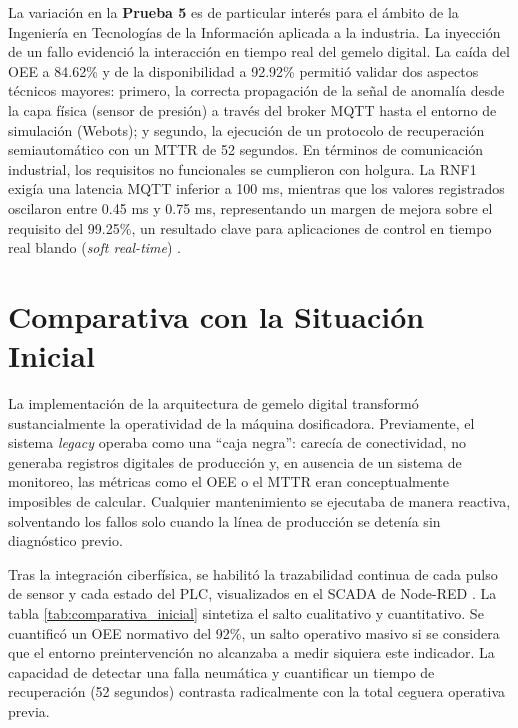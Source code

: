 La variación en la \textbf{Prueba 5} es de particular interés para el ámbito de la Ingeniería en Tecnologías de la Información aplicada a la industria. La inyección de un fallo evidenció la interacción en tiempo real del gemelo digital. La caída del OEE a 84.62\% y de la disponibilidad a 92.92\% permitió validar dos aspectos técnicos mayores: primero, la correcta propagación de la señal de anomalía desde la capa física (sensor de presión) a través del broker MQTT hasta el entorno de simulación (Webots); y segundo, la ejecución de un protocolo de recuperación semiautomático con un MTTR de 52 segundos. En términos de comunicación industrial, los requisitos no funcionales se cumplieron con holgura. La RNF1 exigía una latencia MQTT inferior a 100 ms, mientras que los valores registrados oscilaron entre 0.45 ms y 0.75 ms, representando un margen de mejora sobre el requisito del 99.25\%, un resultado clave para aplicaciones de control en tiempo real blando (\textit{soft real-time}) \cite{AlFuqaha2015IoT}.

\section{Comparativa con la Situación Inicial}

La implementación de la arquitectura de gemelo digital transformó sustancialmente la operatividad de la máquina dosificadora. Previamente, el sistema \textit{legacy} operaba como una “caja negra”: carecía de conectividad, no generaba registros digitales de producción y, en ausencia de un sistema de monitoreo, las métricas como el OEE o el MTTR eran conceptualmente imposibles de calcular. Cualquier mantenimiento se ejecutaba de manera reactiva, solventando los fallos solo cuando la línea de producción se detenía sin diagnóstico previo.

Tras la integración ciberfísica, se habilitó la trazabilidad continua de cada pulso de sensor y cada estado del PLC, visualizados en el SCADA de Node-RED \cite{Zhong2017Industry}. La tabla \ref{tab:comparativa_inicial} sintetiza el salto cualitativo y cuantitativo. Se cuantificó un OEE normativo del 92\%, un salto operativo masivo si se considera que el entorno preintervención no alcanzaba a medir siquiera este indicador. La capacidad de detectar una falla neumática y cuantificar un tiempo de recuperación (52 segundos) contrasta radicalmente con la total ceguera operativa previa.

